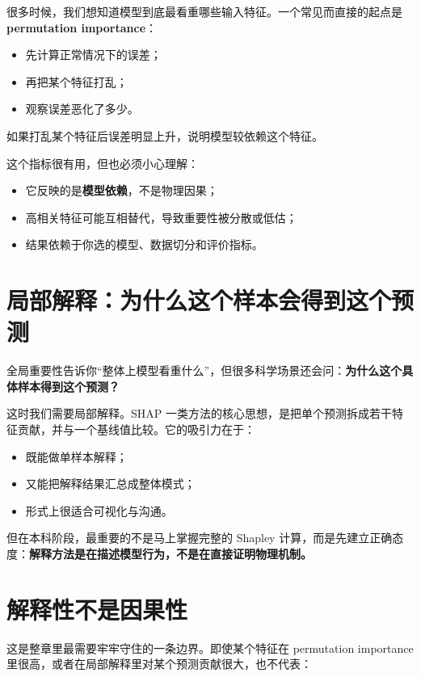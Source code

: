 很多时候，我们想知道模型到底最看重哪些输入特征。一个常见而直接的起点是\textbf{permutation importance}：

\begin{itemize}
    \item 先计算正常情况下的误差；
    \item 再把某个特征打乱；
    \item 观察误差恶化了多少。
\end{itemize}

如果打乱某个特征后误差明显上升，说明模型较依赖这个特征。

这个指标很有用，但也必须小心理解：

\begin{itemize}
    \item 它反映的是\textbf{模型依赖}，不是物理因果；
    \item 高相关特征可能互相替代，导致重要性被分散或低估；
    \item 结果依赖于你选的模型、数据切分和评价指标。
\end{itemize}

\section{局部解释：为什么这个样本会得到这个预测}

全局重要性告诉你“整体上模型看重什么”，但很多科学场景还会问：\textbf{为什么这个具体样本得到这个预测？}

这时我们需要局部解释。SHAP 一类方法的核心思想，是把单个预测拆成若干特征贡献，并与一个基线值比较。它的吸引力在于：

\begin{itemize}
    \item 既能做单样本解释；
    \item 又能把解释结果汇总成整体模式；
    \item 形式上很适合可视化与沟通。
\end{itemize}

但在本科阶段，最重要的不是马上掌握完整的 Shapley 计算，而是先建立正确态度：\textbf{解释方法是在描述模型行为，不是在直接证明物理机制。}

\section{解释性不是因果性}

这是整章里最需要牢牢守住的一条边界。即使某个特征在 permutation importance 里很高，或者在局部解释里对某个预测贡献很大，也不代表：

